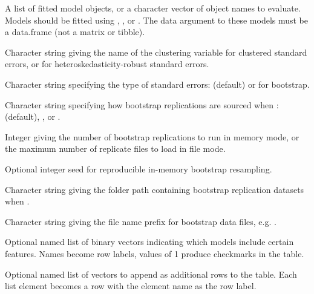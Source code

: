 \documentclass[a4paper]{book}
\begin{document}
\begin{Arguments}
\begin{ldescription}
\item[\code{reg\_list}] A list of fitted model objects, or a character vector of
object names to evaluate. Models should be fitted using ,
, or . The data argument to these models
must be a data.frame (not a matrix or tibble).

\item[\code{clust\_id}] Character string giving the name of the clustering variable
for clustered standard errors, or  for heteroskedasticity-robust
standard errors.

\item[\code{seType}] Character string specifying the type of standard errors:
 (default) or  for bootstrap.

\item[\code{bootstrap\_source}] Character string specifying how bootstrap replications
are sourced when :  (default),
, or .

\item[\code{bootstrap\_reps}] Integer giving the number of bootstrap replications to
run in memory mode, or the maximum number of replicate files to load in
file mode.

\item[\code{bootstrap\_seed}] Optional integer seed for reproducible in-memory
bootstrap resampling.

\item[\code{bootstrap\_dir}] Character string giving the folder path containing
bootstrap replication datasets when .

\item[\code{bootstrap\_prefix}] Character string giving the file name prefix for
bootstrap data files, e.g. .

\item[\code{checkmark\_list}] Optional named list of binary vectors indicating which
models include certain features. Names become row labels, values of 1
produce checkmarks in the table.

\item[\code{addrow\_list}] Optional named list of vectors to append as additional
rows to the table. Each list element becomes a row with the element name
as the row label.


\end{ldescription}
\end{Arguments}
\end{document}
